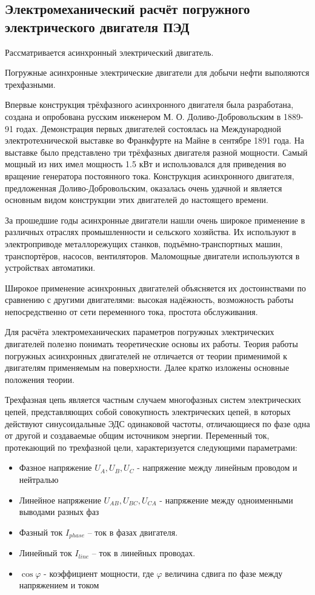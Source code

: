 \subsection{Электромеханический расчёт погружного электрического двигателя ПЭД}
Рассматривается асинхронный электрический двигатель. 

Погружные асинхронные электрические двигатели для добычи нефти выполяются трехфазными. 

Впервые конструкция трёхфазного асинхронного двигателя была разработана, создана и опробована русским инженером М. О. Доливо-Добровольским в 1889-91 годах. Демонстрация первых двигателей состоялась на Международной электротехнической выставке во Франкфурте на Майне в сентябре 1891 года. На выставке было представлено три трёхфазных двигателя разной мощности. Самый мощный из них имел мощность 1.5 кВт и использовался для приведения во вращение генератора постоянного тока. Конструкция асинхронного двигателя, предложенная Доливо-Добровольским, оказалась очень удачной и является основным видом конструкции этих двигателей до настоящего времени.

За прошедшие годы асинхронные двигатели нашли очень широкое применение в различных отраслях промышленности и сельского хозяйства. Их используют в электроприводе металлорежущих станков, подъёмно-транспортных машин, транспортёров, насосов, вентиляторов. Маломощные двигатели используются в устройствах автоматики.

Широкое применение асинхронных двигателей объясняется их достоинствами по сравнению с другими двигателями: высокая надёжность, возможность работы непосредственно от сети переменного тока, простота обслуживания.

Для расчёта электромеханических параметров погружных электрических двигателей полезно понимать теоретические основы их работы. Теория работы погружных асинхронных двигателей не отличается от теории применимой к двигателям применяемым на поверхности. Далее кратко изложены основные положения теории. 

Трехфазная цепь является частным случаем многофазных систем электрических цепей, представляющих собой совокупность электрических цепей, в которых действуют синусоидальные ЭДС одинаковой частоты, отличающиеся по фазе одна от другой и создаваемые общим источником энергии.
Переменный ток, протекающий по трехфазной цели, характеризуется следующими параметрами:

\begin{itemize}
	\item Фазное напряжение $U_A, U_B, U_C $ - напряжение между линейным проводом и нейтралью
	\item Линейное напряжение $U_{AB}, U_{BC}, U_{CA} $ - напряжение между одноименными выводами разных фаз
	\item Фазный ток $I_{phase}$ – ток в фазах двигателя.
	\item Линейный ток $I_{line}$ – ток в линейных проводах.
	\item $ \cos \varphi $ - коэффициент мощности, где $ \varphi$ величина сдвига по фазе между напряжением и током 
\end{itemize}

